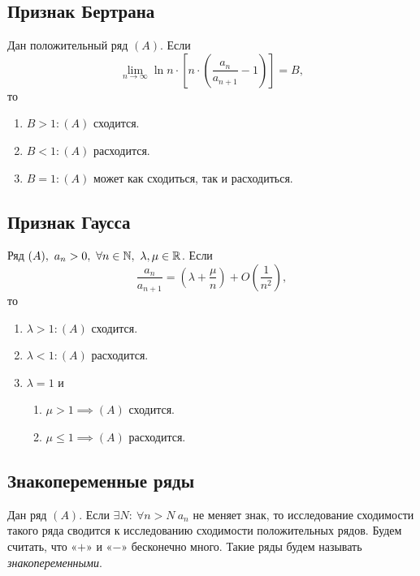 \subsection{Признак Бертрана}

\begin{theorem}
    Дан положительный ряд $(A)$. Если
    \[
        \underset{n\rightarrow\infty}{\lim} \ln n \cdot \left[n \cdot \left(\frac{a_n}{a_{n+1}} - 1\right)\right] = B,
    \]
    то
    \begin{enumerate}
        \item $B > 1: (A)$ сходится.
        \item $B < 1: (A)$ расходится.
        \item $B = 1: (A)$ может как сходиться, так и расходиться.
    \end{enumerate}
\end{theorem}

\newpage

\subsection{Признак Гаусса}

\begin{theorem}
    Ряд $(A), \ a_n > 0, \ \forall n \in \mathbb{N}, \ \lambda, \mu \in \mathbb{R}$. Если
    \[
        \frac{a_n}{a_{n+1}} = \left(\lambda + \frac{\mu}{n}\right) + O\left(\frac{1}{n^2}\right),
    \]
    то
    \begin{enumerate}
        \item $\lambda > 1: (A)$ сходится.
        \item $\lambda < 1: (A)$ расходится.
        \item $\lambda = 1$ и \begin{enumerate}
                  \item $\mu > 1 \implies (A)$ сходится.
                  \item $\mu \leqslant 1 \implies (A)$ расходится.
              \end{enumerate}
    \end{enumerate}
\end{theorem}

\subsection{Знакопеременные ряды}

\begin{note}
    Дан ряд $(A)$. Если $\exists N: \ \forall n > N \ a_n$ не меняет знак, то исследование сходимости такого ряда сводится к исследованию сходимости положительных рядов. Будем считать, что «$+$» и «$-$» бесконечно много. Такие ряды будем называть \emph{знакопеременными}.
\end{note}

